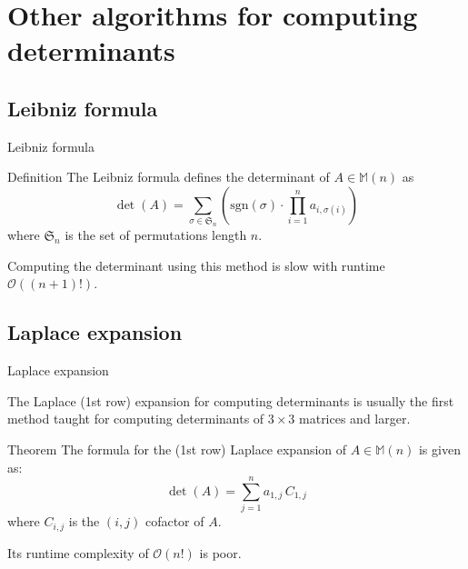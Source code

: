 \documentclass{beamer}
\begin{document}


\section{Other algorithms for computing determinants}

\subsection{Leibniz formula}

\begin{frame}{Leibniz formula}

    \begin{block}{Definition}
        The Leibniz formula defines the determinant of $A \in \mathbb{M}(n)$ as
        \[
            \det(A) = \sum_{\sigma \in \mathfrak{S}_n}
            \left( \text{sgn}(\sigma) \cdot \prod_{i=1}^n a_{i,\sigma(i)} \right)
        \]
        where $\mathfrak{S}_n$ is the set of permutations length $n$.
    \end{block}

    Computing the determinant using this method is slow with runtime $\mathcal{O}((n+1)!)$.

\end{frame}

\subsection{Laplace expansion}

\begin{frame}{Laplace expansion}

    The Laplace (1st row) expansion for computing determinants is usually the first method taught
    for computing determinants of $3 \times 3$ matrices and larger.

    \begin{block}{Theorem}
        The formula for the (1st row) Laplace expansion of $A \in \mathbb{M}(n)$
        is given as:
        \[
            \det(A) = \sum_{j=1}^n a_{1,j}\, C_{1,j}
        \]
        where $C_{i,j}$ is the $(i, j)$ cofactor of $A$.
    \end{block}

    Its runtime complexity of $\mathcal{O}(n!)$ is poor.

\end{frame}
\end{document}
